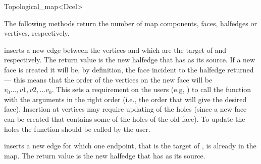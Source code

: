 \begin{ccRefClass}{Topological_map<Dcel>}
\ccQueryFunctions

    The following methods return the number of map components, faces,
    halfedges or vertives, respectively.

     {}
    \ccGlue
     {}
    \ccGlue
     {}

\ccModifiers

     {inserts a new edge
        between the vertices  and  which are the target
        of  and  respectively. The return value
        is the new halfedge that has  as its source.
        If a new face is created it will be, by definition, the face incident
        to the halfedge returned --- this means that the order of the vertices
        on the new face will be $v_0...,v1,v2,...v_0$.
        This sets a requirement on the users (e.g,
        ) to call the function with the arguments
        in the right order (i.e., the order that will give the desired face).
        Insertion at vertices may require updating of the holes  
        (since a 
        new face can be created that contains some of the holes of the old 
        face). To update the holes the function 
         should be called by the user.
        }

    {inserts a new edge for
             which one endpoint,  that is the target of
             , is already in the map.
             The return value is the new halfedge
             that has  as its source.
             }


\end{ccRefClass}
